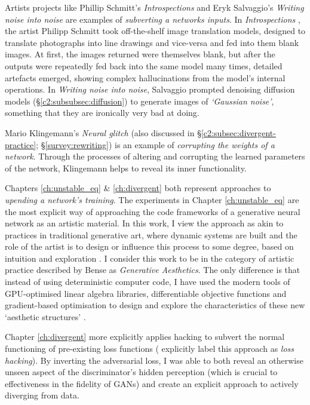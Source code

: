 Artists projects like Phillip Schmitt's \textit{Introspections} \citep{schmitt2019introspections} and Eryk Salvaggio's \textit{Writing noise into noise} \citep{salvaggio2023noise} are examples of \textit{subverting a networks inputs}. 
In \textit{Introspections} \cite{schmitt2019introspections}, the artist Philipp Schmitt took off-the-shelf image translation models, designed to translate photographs into line drawings and vice-versa and fed into them blank images. At first, the images returned were themselves blank, but after the outputs were repeatedly fed back into the same model many times, detailed artefacts emerged, showing complex hallucinations from the model's internal operations.
In \textit{Writing noise into noise}, Salvaggio prompted denoising diffusion models (\S \ref{c2:subsubsec:diffusion}) to generate images of \textit{`Gaussian noise'}, something that they are ironically very bad at doing.

Mario Klingemann's \textit{Neural glitch} (also discussed in \S \ref{c2:subsec:divergent-practice}; \S \ref{survey:rewriting}) is an example of \textit{corrupting the weights of a network}. 
Through the processes of altering and corrupting the learned parameters of the network, Klingemann helps to reveal its inner functionality.

Chapters \ref{ch:unstable_eq} \& \ref{ch:divergent} both represent approaches to \textit{upending a network's training}. 
The experiments in Chapter \ref{ch:unstable_eq} are the most explicit way of approaching the code frameworks of a generative neural network as an artistic material.
In this work, I view the approach as akin to practices in traditional generative art, where dynamic systems are built and the role of the artist is to design or influence this process to some degree, based on intuition and exploration \cite{mccormack2004generative}.
I consider this work to be in the category of artistic practice described by Bense as \textit{Generative Aesthetics}.
The only difference is that instead of using deterministic computer code, I have used the modern tools of GPU-optimised linear algebra libraries, differentiable objective functions and gradient-based optimisation to design and explore the characteristics of these new `aesthetic structures' \citep{bense1965projekte}.

Chapter \ref{ch:divergent} more explicitly applies hacking to subvert the normal functioning of pre-existing loss functions (\cite{berns2020bridging} explicitly label this approach as \textit{loss hacking}).
By inverting the adversarial loss, I was able to both reveal an otherwise unseen aspect of the discriminator's hidden perception (which is crucial to effectiveness in the fidelity of GANs) and create an explicit approach to actively diverging from data.

